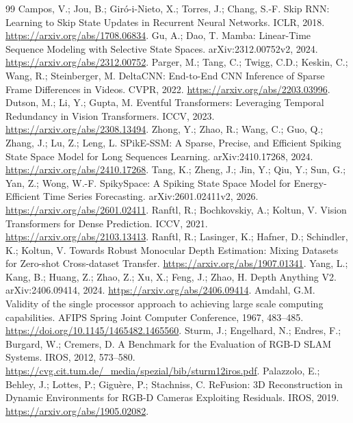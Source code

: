 \documentclass[mathematics,article,submit,moreauthors]{Definitions/mdpi}
\begin{document}
\begin{thebibliography}{99}
 Campos, V.; Jou, B.; Gir\'o-i-Nieto, X.; Torres, J.; Chang, S.-F.
Skip RNN: Learning to Skip State Updates in Recurrent Neural Networks. ICLR, 2018.
\url{https://arxiv.org/abs/1708.06834}.
 Gu, A.; Dao, T. Mamba: Linear-Time Sequence Modeling with Selective State Spaces.
arXiv:2312.00752v2, 2024. \url{https://arxiv.org/abs/2312.00752}.
 Parger, M.; Tang, C.; Twigg, C.D.; Keskin, C.; Wang, R.; Steinberger, M.
DeltaCNN: End-to-End CNN Inference of Sparse Frame Differences in Videos. CVPR, 2022.
\url{https://arxiv.org/abs/2203.03996}.
 Dutson, M.; Li, Y.; Gupta, M.
Eventful Transformers: Leveraging Temporal Redundancy in Vision Transformers. ICCV, 2023.
\url{https://arxiv.org/abs/2308.13494}.
 Zhong, Y.; Zhao, R.; Wang, C.; Guo, Q.; Zhang, J.; Lu, Z.; Leng, L.
SPikE-SSM: A Sparse, Precise, and Efficient Spiking State Space Model for Long Sequences Learning.
arXiv:2410.17268, 2024. \url{https://arxiv.org/abs/2410.17268}.
 Tang, K.; Zheng, J.; Jin, Y.; Qiu, Y.; Sun, G.; Yan, Z.; Wong, W.-F.
SpikySpace: A Spiking State Space Model for Energy-Efficient Time Series Forecasting.
arXiv:2601.02411v2, 2026. \url{https://arxiv.org/abs/2601.02411}.
 Ranftl, R.; Bochkovskiy, A.; Koltun, V.
Vision Transformers for Dense Prediction. ICCV, 2021. \url{https://arxiv.org/abs/2103.13413}.
 Ranftl, R.; Lasinger, K.; Hafner, D.; Schindler, K.; Koltun, V.
Towards Robust Monocular Depth Estimation: Mixing Datasets for Zero-shot Cross-dataset Transfer.
\url{https://arxiv.org/abs/1907.01341}.
 Yang, L.; Kang, B.; Huang, Z.; Zhao, Z.; Xu, X.; Feng, J.; Zhao, H.
Depth Anything V2. arXiv:2406.09414, 2024. \url{https://arxiv.org/abs/2406.09414}.
 Amdahl, G.M. Validity of the single processor approach to achieving
large scale computing capabilities. AFIPS Spring Joint Computer Conference, 1967, 483--485.
\url{https://doi.org/10.1145/1465482.1465560}.
 Sturm, J.; Engelhard, N.; Endres, F.; Burgard, W.; Cremers, D.
A Benchmark for the Evaluation of RGB-D SLAM Systems. IROS, 2012, 573--580.
\url{https://cvg.cit.tum.de/_media/spezial/bib/sturm12iros.pdf}.
 Palazzolo, E.; Behley, J.; Lottes, P.; Gigu\`ere, P.; Stachniss, C.
ReFusion: 3D Reconstruction in Dynamic Environments for RGB-D Cameras Exploiting Residuals.
IROS, 2019. \url{https://arxiv.org/abs/1905.02082}.
\end{thebibliography}
\end{document}
